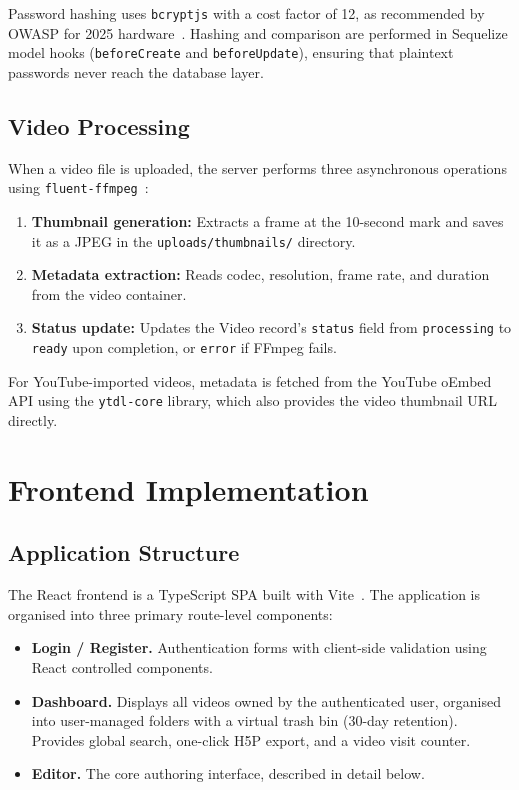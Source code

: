 Password hashing uses \texttt{bcryptjs} with a cost factor of 12, as
recommended by OWASP for 2025 hardware~\cite{owasp2021}. Hashing and
comparison are performed in Sequelize model hooks (\texttt{beforeCreate}
and \texttt{beforeUpdate}), ensuring that plaintext passwords never reach
the database layer.

\subsection{Video Processing}

When a video file is uploaded, the server performs three asynchronous
operations using \texttt{fluent-ffmpeg}~\cite{ffmpeg2023}:

\begin{enumerate}
  \item \textbf{Thumbnail generation:} Extracts a frame at the 10-second
  mark and saves it as a JPEG in the \texttt{uploads/thumbnails/} directory.
  \item \textbf{Metadata extraction:} Reads codec, resolution, frame rate,
  and duration from the video container.
  \item \textbf{Status update:} Updates the Video record's \texttt{status}
  field from \texttt{processing} to \texttt{ready} upon completion, or
  \texttt{error} if FFmpeg fails.
\end{enumerate}

For YouTube-imported videos, metadata is fetched from the YouTube oEmbed
API using the \texttt{ytdl-core} library, which also provides the video
thumbnail URL directly.

\section{Frontend Implementation}

\subsection{Application Structure}

The React frontend is a TypeScript SPA built with Vite~\cite{vite2023}. The
application is organised into three primary route-level components:

\begin{itemize}
  \item \textbf{Login / Register.} Authentication forms with client-side
  validation using React controlled components.
  \item \textbf{Dashboard.} Displays all videos owned by the authenticated
  user, organised into user-managed folders with a virtual trash bin
  (30-day retention). Provides global search, one-click H5P export, and a
  video visit counter.
  \item \textbf{Editor.} The core authoring interface, described in detail
  below.
\end{itemize}

